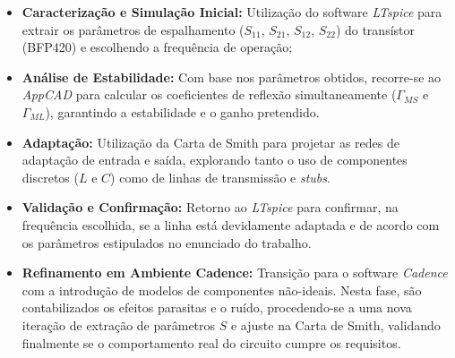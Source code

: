 \begin{itemize}
    \item \textbf{Caracterização e Simulação Inicial:} Utilização do software \textit{LTspice} para extrair os parâmetros de espalhamento ($S_{11}$, $S_{21}$, $S_{12}$, $S_{22}$) do transístor (BFP420) e escolhendo a frequência de operação;
    
    \item \textbf{Análise de Estabilidade:} Com base nos parâmetros obtidos, recorre-se ao \textit{AppCAD} para calcular os coeficientes de reflexão simultaneamente ($\Gamma_{MS}$ e $\Gamma_{ML}$), garantindo a estabilidade e o ganho pretendido.
    
    \item \textbf{Adaptação:} Utilização da Carta de Smith para projetar as redes de adaptação de entrada e saída, explorando tanto o uso de componentes discretos ($L$ e $C$) como de linhas de transmissão e \textit{stubs}.
    
    \item \textbf{Validação e Confirmação:} Retorno ao \textit{LTspice} para confirmar, na frequência escolhida, se a linha está devidamente adaptada e de acordo com os parâmetros estipulados no enunciado do trabalho.
    
    \item \textbf{Refinamento em Ambiente Cadence:} Transição para o software \textit{Cadence} com a introdução de modelos de componentes não-ideais. Nesta fase, são contabilizados os efeitos parasitas e o ruído, procedendo-se a uma nova iteração de extração de parâmetros $S$ e ajuste na Carta de Smith, validando finalmente se o comportamento real do circuito cumpre os requisitos.
\end{itemize}
